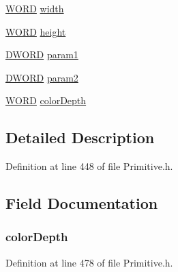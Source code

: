 \begin{DoxyCompactItemize}
\begin{tabbing}
\end{tabbing}\item 
\hyperlink{_generic_type_defs_8h_a2b0e863dadf920709ec53d9088ee7c91}{W\+O\+R\+D} \hyperlink{struct_g_f_x___i_m_a_g_e___h_e_a_d_e_r_a1fd31a71d8ffffeeacaa6eef4782ee24}{width}
\item 
\hyperlink{_generic_type_defs_8h_a2b0e863dadf920709ec53d9088ee7c91}{W\+O\+R\+D} \hyperlink{struct_g_f_x___i_m_a_g_e___h_e_a_d_e_r_a919b3b1495d055253ab29ef130f6d9cf}{height}
\item 
\hyperlink{_generic_type_defs_8h_ad342ac907eb044443153a22f964bf0af}{D\+W\+O\+R\+D} \hyperlink{struct_g_f_x___i_m_a_g_e___h_e_a_d_e_r_a4543383e5c72cce2ab6f290b3e7c5ed3}{param1}
\item 
\hyperlink{_generic_type_defs_8h_ad342ac907eb044443153a22f964bf0af}{D\+W\+O\+R\+D} \hyperlink{struct_g_f_x___i_m_a_g_e___h_e_a_d_e_r_a0d8b4d2450626fd9398f5f3789d0ceb9}{param2}
\item 
\hyperlink{_generic_type_defs_8h_a2b0e863dadf920709ec53d9088ee7c91}{W\+O\+R\+D} \hyperlink{struct_g_f_x___i_m_a_g_e___h_e_a_d_e_r_ac98014aef32ef273c76aa17154343a04}{color\+Depth}
\end{DoxyCompactItemize}


\subsection{Detailed Description}


Definition at line 448 of file Primitive.\+h.



\subsection{Field Documentation}
\hypertarget{struct_g_f_x___i_m_a_g_e___h_e_a_d_e_r_ac98014aef32ef273c76aa17154343a04}{}
\subsubsection[{color\+Depth}]{ color\+Depth}\label{struct_g_f_x___i_m_a_g_e___h_e_a_d_e_r_ac98014aef32ef273c76aa17154343a04}


Definition at line 478 of file Primitive.\+h.

